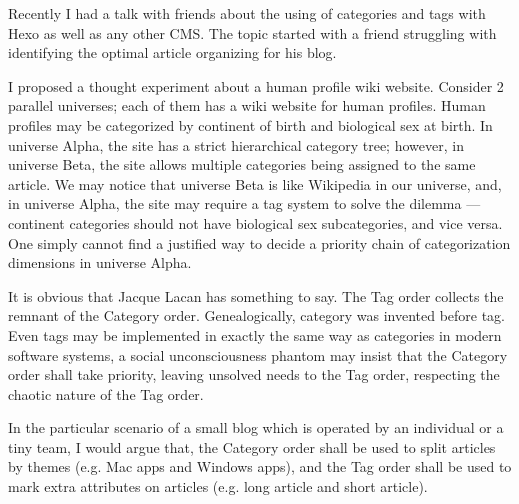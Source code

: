 

Recently I had a talk with friends about the using of categories and tags with Hexo as well as any other CMS.
The topic started with a friend struggling with identifying the optimal article organizing for his blog.

I proposed a thought experiment about a human profile wiki website.
Consider 2 parallel universes; each of them has a wiki website for human profiles.
Human profiles may be categorized by continent of birth and biological sex at birth.
In universe Alpha, the site has a strict hierarchical category tree;
however, in universe Beta, the site allows multiple categories being assigned to the same article.
We may notice that universe Beta is like Wikipedia in our universe, and, in universe Alpha,
the site may require a tag system to solve the dilemma ---
continent categories should not have biological sex subcategories, and vice versa.
One simply cannot find a justified way to decide a priority chain of categorization dimensions in universe Alpha.

It is obvious that Jacque Lacan has something to say.
The Tag order collects the remnant of the Category order.
Genealogically, category was invented before tag.
Even tags may be implemented in exactly the same way as categories in modern software systems,
a social unconsciousness phantom may insist that the Category order shall take priority,
leaving unsolved needs to the Tag order, respecting the chaotic nature of the Tag order.

In the particular scenario of a small blog which is operated by an individual or a tiny team,
I would argue that, the Category order shall be used to split articles by themes (e.g. Mac apps and Windows apps),
and the Tag order shall be used to mark extra attributes on articles (e.g. long article and short article).


